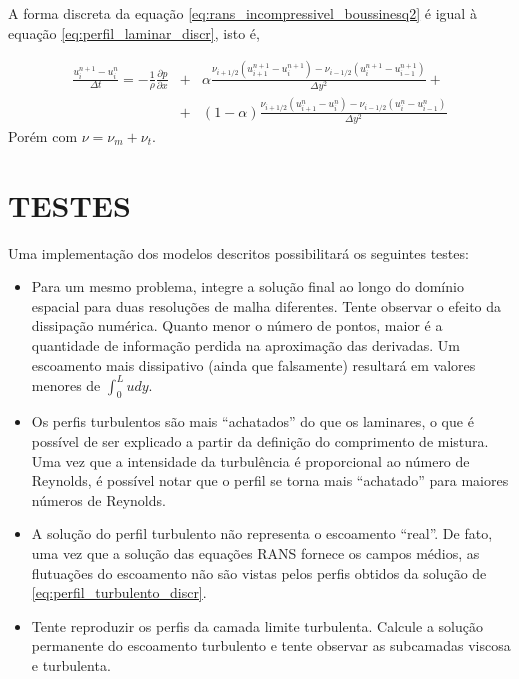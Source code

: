 \documentclass[a4paper,portuguese,10pt]{article}
\renewcommand{\D}{\partial}
\begin{document}
A forma discreta da equação \ref{eq:rans_incompressivel_boussinesq2} é igual à equação \ref{eq:perfil_laminar_discr}, isto é,

\begin{eqnarray}
  \frac{u_i^{n+1}-u_i^n}{\Delta t} = -\frac{1}{\rho}\frac{\D p}{\D x} &+& \alpha\frac{\nu_{i+1/2}(u_{i+1}^{n+1}-u_{i}^{n+1})-\nu_{i-1/2}(u_{i}^{n+1}-u_{i-1}^{n+1})}{\Delta y^2}+\nonumber\\ &+& (1-\alpha)\frac{\nu_{i+1/2}(u_{i+1}^n-u_{i}^n)-\nu_{i-1/2}(u_{i}^n-u_{i-1}^n)}{\Delta y^2}
  \label{eq:perfil_turbulento_discr}
\end{eqnarray}
Porém com $\nu = \nu_m+\nu_t$.

\section{TESTES}

Uma implementação dos modelos descritos possibilitará os seguintes testes:

\begin{itemize}
   \item Para um mesmo problema, integre a solução final ao longo do domínio espacial para duas resoluções de malha diferentes. Tente observar o efeito da dissipação numérica. Quanto menor o número de pontos, maior é a quantidade de informação perdida na aproximação das derivadas. Um escoamento mais dissipativo (ainda que falsamente) resultará em valores menores de $\int_0^Ludy$.
   \item Os perfis turbulentos são mais ``achatados'' do que os laminares, o que é possível de ser explicado a partir da definição do comprimento de mistura. Uma vez que a intensidade da turbulência é proporcional ao número de Reynolds, é possível notar que o perfil se torna mais ``achatado'' para maiores números de Reynolds.
   \item A solução do perfil turbulento não representa o escoamento ``real''. De fato, uma vez que a solução das equações RANS fornece os campos médios, as flutuações do escoamento não são vistas pelos perfis obtidos da solução de \ref{eq:perfil_turbulento_discr}.
   \item Tente reproduzir os perfis da camada limite turbulenta. Calcule a solução permanente do escoamento turbulento e tente observar as subcamadas viscosa e turbulenta.
\end{itemize}


\singlespacing




\end{document}
